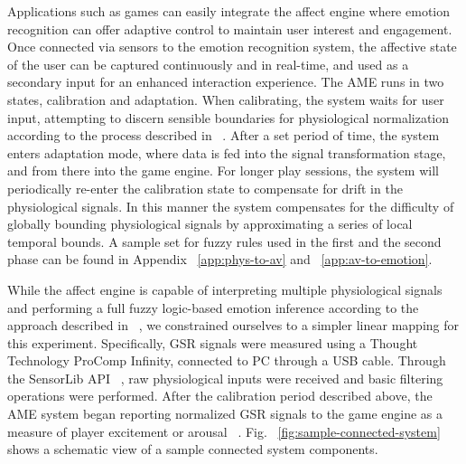 
Applications such as games can easily integrate the affect engine where emotion recognition can offer adaptive control to maintain user interest and engagement. Once connected via sensors to the emotion recognition system, the affective state of the user can be captured continuously and in real-time, and used as a secondary input for an enhanced interaction experience. The AME runs in two states, calibration and adaptation. When calibrating, the system waits for user input, attempting to discern sensible boundaries for physiological normalization according to the process described in ~\cite{mandryk2007fuzzy}. After a set period of time, the system enters adaptation mode, where data is fed into the signal transformation stage, and from there into the game engine. For longer play sessions, the system will periodically re-enter the calibration state to compensate for drift in the physiological signals. In this manner the system compensates for the difficulty of globally bounding physiological signals by approximating a series of local temporal bounds. A sample set for fuzzy rules used in the first and the second phase can be found in Appendix ~\ref{app:phys-to-av} and ~\ref{app:av-to-emotion}.

While the affect engine is capable of interpreting multiple physiological signals and performing a full fuzzy logic-based emotion inference according to the approach described in ~\cite{mandryk2007fuzzy}, we constrained ourselves to a simpler linear mapping for this experiment. Specifically, GSR signals were measured using a Thought Technology ProComp Infinity, connected to PC through a USB cable. Through the SensorLib API ~\cite{nacke2011biofeedback}, raw physiological inputs were received and basic filtering operations were performed. After the calibration period described above, the AME system began reporting normalized GSR signals to the game engine as a measure of player excitement or arousal ~\cite{aggag2011affective, tijs2009creating}. Fig. ~\ref{fig:sample-connected-system} shows a schematic view of a sample connected system components.

